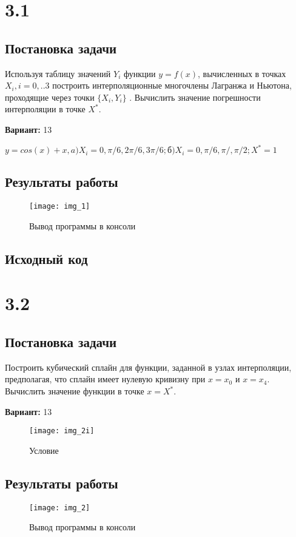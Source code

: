 \section* {3.1}

\subsection{Постановка задачи}
Используя таблицу значений $Y_i$  функции $y=f(x)$, вычисленных в точках   $X_i, i=0,..3$  построить интерполяционные многочлены Лагранжа и Ньютона, проходящие через точки $\{X_i,Y_i \}$ .  Вычислить значение погрешности интерполяции в точке $X^*$. 

{\bfseries Вариант:} 13

$y=cos(x)+x, a)X_i= 0,\pi/6,2\pi/6,3\pi/6;  б)X_i= 0,\pi/6,\pi/,\pi/2; X^* = 1$

\subsection{Результаты работы}
\begin{figure}[h!]
\centering
\texttt{[image: img\_1]}
\caption{Вывод программы в консоли}
\end{figure}
\pagebreak


\subsection{Исходный код}


\pagebreak

\section* {3.2}

\subsection{Постановка задачи}
Построить кубический сплайн для функции, заданной в узлах интерполяции, предполагая, что сплайн имеет нулевую кривизну при $x=x_0$  и $x=x_4$. Вычислить значение функции в точке $x=X^*$. 

{\bfseries Вариант:} 13
\begin{figure}[h!]
\centering
\texttt{[image: img\_2i]}
\caption{Условие}
\end{figure}

\subsection{Результаты работы}
\begin{figure}[h!]
\centering
\texttt{[image: img\_2]}
\caption{Вывод программы в консоли}
\end{figure}
\pagebreak

